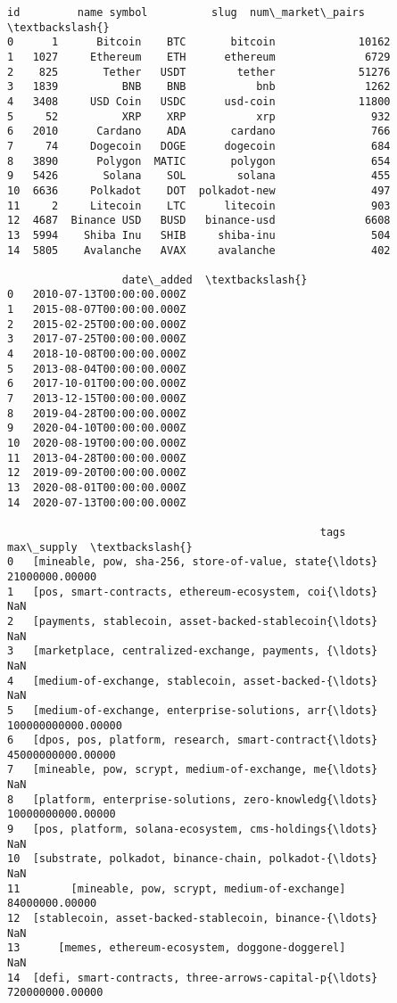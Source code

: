 \documentclass[11pt]{article}
\makeatletter
\newcommand{\boxspacing}{\kern\kvtcb@left@rule\kern\kvtcb@boxsep}
\newcommand{\prompt}[4]{
        {\ttfamily\llap{{\color{#2}[#3]:\hspace{3pt}#4}}\vspace{-\baselineskip}}
    }
\makeatother
\begin{document}
            \begin{tcolorbox}[breakable, size=fbox, boxrule=.5pt, pad at break*=1mm, opacityfill=0]
\prompt{Out}{outcolor}{42}{\boxspacing}
\begin{Verbatim}[commandchars=\\\{\}]
      id         name symbol          slug  num\_market\_pairs  \textbackslash{}
0      1      Bitcoin    BTC       bitcoin             10162
1   1027     Ethereum    ETH      ethereum              6729
2    825       Tether   USDT        tether             51276
3   1839          BNB    BNB           bnb              1262
4   3408     USD Coin   USDC      usd-coin             11800
5     52          XRP    XRP           xrp               932
6   2010      Cardano    ADA       cardano               766
7     74     Dogecoin   DOGE      dogecoin               684
8   3890      Polygon  MATIC       polygon               654
9   5426       Solana    SOL        solana               455
10  6636     Polkadot    DOT  polkadot-new               497
11     2     Litecoin    LTC      litecoin               903
12  4687  Binance USD   BUSD   binance-usd              6608
13  5994    Shiba Inu   SHIB     shiba-inu               504
14  5805    Avalanche   AVAX     avalanche               402

                  date\_added  \textbackslash{}
0   2010-07-13T00:00:00.000Z
1   2015-08-07T00:00:00.000Z
2   2015-02-25T00:00:00.000Z
3   2017-07-25T00:00:00.000Z
4   2018-10-08T00:00:00.000Z
5   2013-08-04T00:00:00.000Z
6   2017-10-01T00:00:00.000Z
7   2013-12-15T00:00:00.000Z
8   2019-04-28T00:00:00.000Z
9   2020-04-10T00:00:00.000Z
10  2020-08-19T00:00:00.000Z
11  2013-04-28T00:00:00.000Z
12  2019-09-20T00:00:00.000Z
13  2020-08-01T00:00:00.000Z
14  2020-07-13T00:00:00.000Z

                                                 tags         max\_supply  \textbackslash{}
0   [mineable, pow, sha-256, store-of-value, state{\ldots}     21000000.00000
1   [pos, smart-contracts, ethereum-ecosystem, coi{\ldots}                NaN
2   [payments, stablecoin, asset-backed-stablecoin{\ldots}                NaN
3   [marketplace, centralized-exchange, payments, {\ldots}                NaN
4   [medium-of-exchange, stablecoin, asset-backed-{\ldots}                NaN
5   [medium-of-exchange, enterprise-solutions, arr{\ldots} 100000000000.00000
6   [dpos, pos, platform, research, smart-contract{\ldots}  45000000000.00000
7   [mineable, pow, scrypt, medium-of-exchange, me{\ldots}                NaN
8   [platform, enterprise-solutions, zero-knowledg{\ldots}  10000000000.00000
9   [pos, platform, solana-ecosystem, cms-holdings{\ldots}                NaN
10  [substrate, polkadot, binance-chain, polkadot-{\ldots}                NaN
11        [mineable, pow, scrypt, medium-of-exchange]     84000000.00000
12  [stablecoin, asset-backed-stablecoin, binance-{\ldots}                NaN
13      [memes, ethereum-ecosystem, doggone-doggerel]                NaN
14  [defi, smart-contracts, three-arrows-capital-p{\ldots}    720000000.00000


\end{Verbatim}
\end{tcolorbox}
\end{document}
